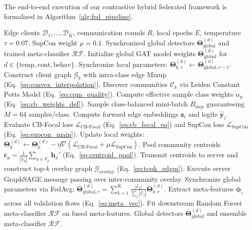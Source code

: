 \documentclass[12pt,a4paper]{report}
\begin{document}
\label{sec:algorithms}

The end-to-end execution of our contrastive hybrid federated framework is formalized in Algorithm~\ref{alg:fed_pipeline}.

\begin{algorithm}[H]
\caption{Overall Federated Contrastive GNN Training Pipeline}
\label{alg:fed_pipeline}
\begin{algorithmic}[1]
\Require Edge clients $\mathcal{D}_1, \dots, \mathcal{D}_K$, communication rounds $R$, local epochs $E$, temperature $\tau = 0.07$, SupCon weight $\mu = 0.1$.
\Ensure Synchronized global detectors $\boldsymbol{\Theta}_{\text{global}}^{(d)}$ and trained meta-classifier $\mathcal{RF}$.
\STATE Initialize global GAT model weights $\boldsymbol{\Theta}_{\text{global}}^{(d)}$ for $d \in \{\text{temp}, \text{cont}, \text{behav}\}$.
        \STATE Synchronize local parameters: $\boldsymbol{\Theta}_{k, r}^{(d)} \leftarrow \boldsymbol{\Theta}_{\text{global}, r-1}^{(d)}$.
        \STATE Construct client graph $\mathcal{G}_k$ with intra-class edge Mixup (Eq.~\ref{eq:convex_interpolation}).
        \STATE Discover communities $\mathcal{C}_k$ via Leiden Constant Potts Model (Eq.~\ref{eq:cpm_quality}).
        \STATE Compute effective sample class weights $\alpha_y$ (Eq.~\ref{eq:cb_weights_def}).
            \STATE Sample class-balanced mini-batch $B_{\text{step}}$ guaranteeing $M = 64$ samples/class.
            \STATE Compute forward edge embeddings $\boldsymbol{z}_i$ and logits $\hat{\boldsymbol{y}}_i$.
            \STATE Evaluate CB-Focal loss $\mathcal{L}_{\text{CB-Focal}}$ (Eq.~\ref{eq:cb_focal_eq}) and SupCon loss $\mathcal{L}_{\text{SupCon}}$ (Eq.~\ref{eq:supcon_main}).
            \STATE Update local weights: $\boldsymbol{\Theta}_k^{(d)} \leftarrow \boldsymbol{\Theta}_k^{(d)} - \eta \nabla (\mathcal{L}_{\text{CB-Focal}} + \mu \mathcal{L}_{\text{SupCon}})$.
        \ENDFOR
        \STATE Pool community centroids $\boldsymbol{c}_p = \frac{1}{|V_p|} \sum_{u \in V_p} \boldsymbol{h}_u'$ (Eq.~\ref{eq:centroid_pool}).
    \ENDFOR
    \STATE Transmit centroids to server and construct top-$k$ overlay graph $\mathcal{G}_{\text{overlay}}$ (Eq.~\ref{eq:topk_edges}).
    \STATE Execute server GraphSAGE message passing over inter-community overlay.
    \STATE Synchronize global parameters via FedAvg: $\boldsymbol{\Theta}_{\text{global}, r}^{(d)} = \sum_{k=1}^K \frac{|\mathcal{E}_k|}{\sum_j |\mathcal{E}_j|} \boldsymbol{\Theta}_{k, r}^{(d)}$.
\ENDFOR
\STATE Extract meta-features $\boldsymbol{\phi}_i$ across all validation flows (Eq.~\ref{eq:meta_vec}).
\STATE Fit downstream Random Forest meta-classifier $\mathcal{RF}$ on fused meta-features.
\RETURN Global detectors $\boldsymbol{\Theta}_{\text{global}}^{(d)}$ and ensemble meta-classifier $\mathcal{RF}$.
\end{algorithmic}
\end{algorithm}
\end{document}
